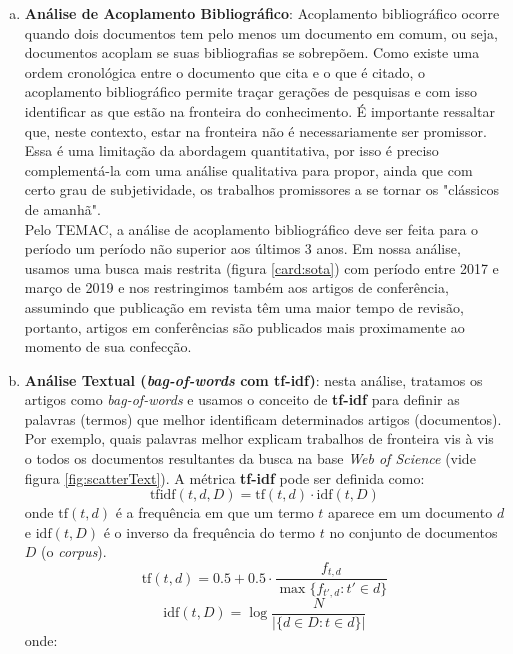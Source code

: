 \documentclass[sigconf]{acmart}
\begin{document}
\begin{enumerate}[a)]
  \item{\textbf{Análise de Acoplamento Bibliográfico}: Acoplamento bibliográfico ocorre quando dois documentos tem pelo menos um documento em comum, ou seja, documentos acoplam se suas bibliografias se sobrepõem. Como existe uma ordem cronológica entre o documento que cita e o que é citado, o acoplamento bibliográfico permite traçar gerações de pesquisas e com isso identificar as que estão na fronteira do conhecimento.  É importante ressaltar que, neste contexto, estar na fronteira não é necessariamente ser promissor. Essa é uma limitação da abordagem quantitativa, por isso é preciso complementá-la com uma análise qualitativa para propor, ainda que com certo grau de subjetividade, os trabalhos promissores a se tornar os "clássicos de amanhã". \\Pelo TEMAC, a análise de acoplamento bibliográfico deve ser feita para o período um período não superior aos últimos 3 anos. Em nossa análise, usamos uma busca mais restrita (figura \ref{card:sota}) com período entre 2017 e março de 2019 e nos restringimos também aos artigos de conferência, assumindo que publicação em revista têm uma maior tempo de revisão, portanto, artigos em conferências são publicados mais proximamente ao momento de sua confecção. 
  }
  \item{\textbf{Análise Textual (\emph{bag-of-words}  com tf-idf)}: nesta análise, tratamos os artigos como \emph{bag-of-words} e usamos o conceito de \textbf{tf-idf} para definir as palavras (termos) que melhor identificam determinados artigos (documentos). Por exemplo, quais palavras melhor explicam trabalhos de fronteira vis à vis o todos os documentos resultantes da busca na base \emph{Web of Science} (vide figura \ref{fig:scatterText}). A métrica \textbf{tf-idf} pode ser definida como:
  \begin{equation}
    \mathrm{tfidf}(t,d,D) = \mathrm{tf}(t,d) \cdot \mathrm{idf}(t, D)
  \end{equation}
  onde $\mathrm{tf}(t,d)$ é a frequência em que um termo $t$ aparece em um documento $d$ e $\mathrm{idf}(t, D)$ é o inverso da frequência do termo $t$ no conjunto de documentos $D$ (o \emph{corpus}). 
  \begin{equation}
    \mathrm{tf}(t,d) = 0.5 + 0.5 \cdot  \frac{f_{t, d}}{\max\{f_{t', d}:t' \in d\}}
  \end{equation}
  \begin{equation}
    \mathrm{idf}(t, D) =  \log \frac{N}{|\{d \in D: t \in d\}|}
  \end{equation}
  onde:
  
}
\end{enumerate}
\end{document}
